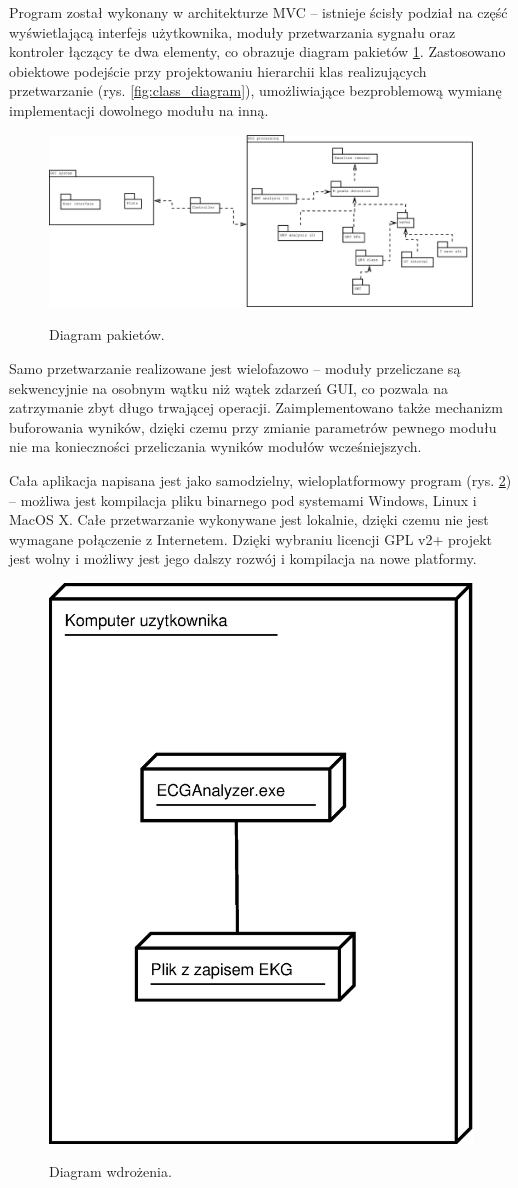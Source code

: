 \documentclass[a4paper, 11pt]{article}
\begin{document}
Program został wykonany w architekturze MVC -- istnieje ścisły podział na część wyświetlającą interfejs użytkownika, moduły przetwarzania sygnału oraz kontroler łączący te dwa elementy, co obrazuje diagram pakietów \ref{fig:package_diagram}. Zastosowano obiektowe podejście przy projektowaniu hierarchii klas realizujących przetwarzanie (rys. \ref{fig:class_diagram}), umożliwiające bezproblemową wymianę implementacji dowolnego modułu na inną.

\begin{figure}[h!]
  \centering
  \includegraphics[width=\linewidth]{include/package_diagram}
  \label{fig:package_diagram}
  \caption{Diagram pakietów.}
\end{figure}

Samo przetwarzanie realizowane jest wielofazowo -- moduły przeliczane są sekwencyjnie na osobnym wątku niż wątek zdarzeń GUI, co pozwala na zatrzymanie zbyt długo trwającej operacji. Zaimplementowano także mechanizm buforowania wyników, dzięki czemu przy zmianie parametrów pewnego modułu nie ma konieczności przeliczania wyników modułów wcześniejszych.

Cała aplikacja napisana jest jako samodzielny, wieloplatformowy program (rys. \ref{fig:deployment_diagram}) -- możliwa jest kompilacja pliku binarnego pod systemami Windows, Linux i MacOS X. Całe przetwarzanie wykonywane jest lokalnie, dzięki czemu nie jest wymagane połączenie z Internetem. Dzięki wybraniu licencji GPL v2+ projekt jest wolny i możliwy jest jego dalszy rozwój i kompilacja na nowe platformy.

\begin{figure}[h!]
  \centering
  \includegraphics[width=0.5\linewidth]{include/deployment_diagram}
  \label{fig:deployment_diagram}
  \caption{Diagram wdrożenia.}
\end{figure}
\end{document}
